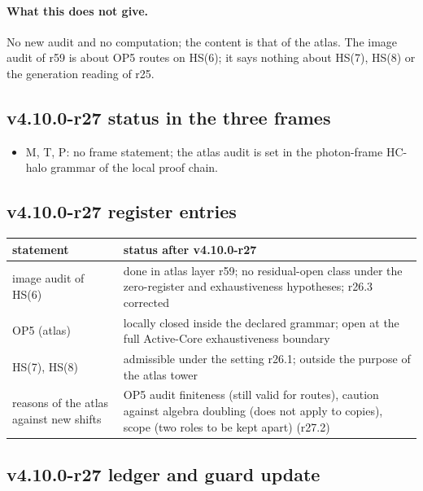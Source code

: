 \paragraph{What this does not give.}
No new audit and no computation; the content is that of the atlas.  The image audit of r59 is about OP5 routes on HS(6); it says nothing
about HS(7), HS(8) or the generation reading of r25.

\subsection*{v4.10.0-r27 status in the three frames}
\label{subsec:v4100-r27-frames}

\begin{itemize}[leftmargin=2em]
\item M, T, P: no frame statement; the atlas audit is set in the photon-frame HC-halo grammar of the local proof chain.
\end{itemize}

\subsection*{v4.10.0-r27 register entries}
\label{subsec:v4100-r27-register}

\begin{center}
\small
\begin{tabular}{@{}>{\raggedright\arraybackslash}p{}>{\raggedright\arraybackslash}p{}@{}}
\toprule
statement & status after v4.10.0-r27\\
\midrule
image audit of HS(6) & done in atlas layer r59; no residual-open class under the zero-register and exhaustiveness hypotheses; r26.3 corrected\\
OP5 (atlas) & locally closed inside the declared grammar; open at the full Active-Core exhaustiveness boundary\\
HS(7), HS(8) & admissible under the setting r26.1; outside the purpose of the atlas tower\\
reasons of the atlas against new shifts & OP5 audit finiteness (still valid for routes), caution against algebra doubling (does not apply to copies), scope (two roles to be kept apart) (r27.2)\\
\bottomrule
\end{tabular}
\end{center}

\subsection*{v4.10.0-r27 ledger and guard update}
\label{subsec:v4100-r27-ledger-guard}

